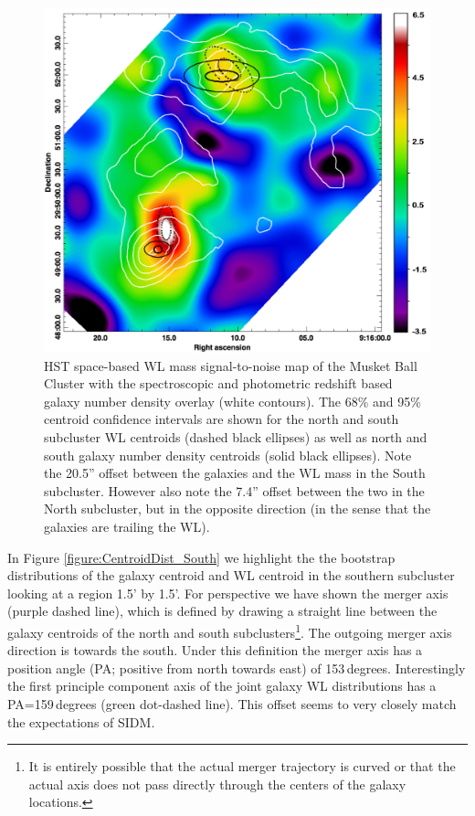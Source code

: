 \begin{figure}
\centering
\includegraphics[width=5in]{Chapter4/LensingGalaxyOverlay.png}
\caption[Musket Ball Cluster weak lensing signal-to-noise map with galaxy number density map overlay, including centroid locations.]{
HST space-based WL mass signal-to-noise map of the Musket Ball Cluster with the spectroscopic and photometric redshift based galaxy number density overlay (white contours).
The 68\% and 95\% centroid confidence intervals are shown for the north and south subcluster WL centroids (dashed black ellipses) as well as north and south galaxy number density centroids (solid black ellipses).
Note the 20.5'' offset between the galaxies and the WL mass in the South subcluster.
However also note the 7.4'' offset between the two in the North subcluster, but in the opposite direction (in the sense that the galaxies are trailing the WL).
}
\label{figure:LensingGalaxyOverlay}
\end{figure}

In Figure \ref{figure:CentroidDist_South} we highlight the the bootstrap distributions of the galaxy centroid and WL centroid in the southern subcluster looking at a region 1.5' by 1.5'.
For perspective we have shown the merger axis (purple dashed line), which is defined by drawing a straight line between the galaxy centroids of the north and south subclusters\footnote{It is entirely possible that the actual merger trajectory is curved or that the actual axis does not pass directly through the centers of the galaxy locations.}.
The outgoing merger axis direction is towards the south.
Under this definition the merger axis has a position angle (PA; positive from north towards east) of 153\,degrees.
Interestingly the first principle component axis of the joint galaxy WL distributions has a PA=159\,degrees (green dot-dashed line).
This offset seems to very closely match the expectations of SIDM.

